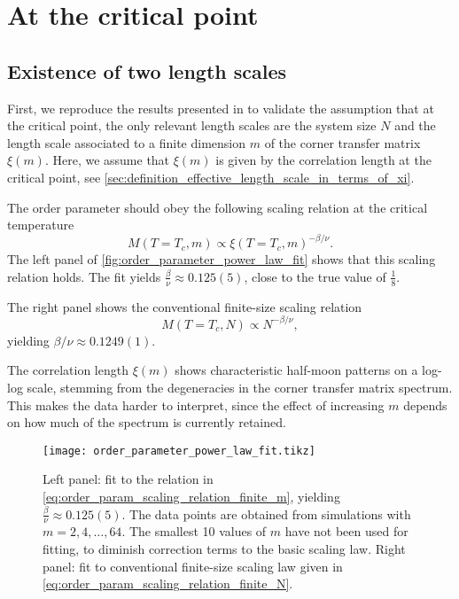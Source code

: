 
\section{At the critical point}

\subsection{Existence of two length scales}

First, we reproduce the results presented in \cite{nishino1996numerical} to validate the assumption that at the critical
point, the only relevant length scales are the system size $N$ and the length scale associated to a finite dimension $m$
of the corner transfer matrix $\xi(m)$.
Here, we assume that $\xi(m)$ is given by the correlation length at the critical point,
see \autoref{sec:definition_effective_length_scale_in_terms_of_xi}.

The order parameter should obey the following scaling relation at
the critical temperature
\begin{equation}\label{eq:order_param_scaling_relation_finite_m}
  M(T = T_c, m) \propto \xi(T = T_c, m)^{-\beta/\nu}.
\end{equation}
The left panel of \autoref{fig:order_parameter_power_law_fit} shows that this scaling
relation holds. The fit yields $\frac{\beta}{\nu} \approx 0.125(5)$, close to the true
value of $\frac{1}{8}$.

The right panel shows the conventional finite-size scaling relation
\begin{equation}\label{eq:order_param_scaling_relation_finite_N}
  M(T = T_c, N) \propto N^{-\beta/\nu},
\end{equation}
yielding $\beta/\nu \approx 0.1249(1)$.

The correlation length $\xi(m)$ shows characteristic half-moon patterns on a
log-log scale, stemming from the degeneracies in the corner transfer matrix spectrum. This
makes the data harder to interpret, since the effect of increasing $m$ depends on how much
of the spectrum is currently retained.


\begin{figure}
  \texttt{[image: order\_parameter\_power\_law\_fit.tikz]}
  \caption{Left panel: fit to the relation in
  \autoref{eq:order_param_scaling_relation_finite_m}, yielding $\frac{\beta}{\nu} \approx
  0.125(5)$. The data points are obtained from simulations with $m = 2, 4, \dots, 64$. The
  smallest 10 values of $m$ have not been used for fitting, to diminish correction terms
  to the basic scaling law. Right panel: fit to conventional finite-size scaling law
  given in \autoref{eq:order_param_scaling_relation_finite_N}.
  }
  \label{fig:order_parameter_power_law_fit}
\end{figure}

